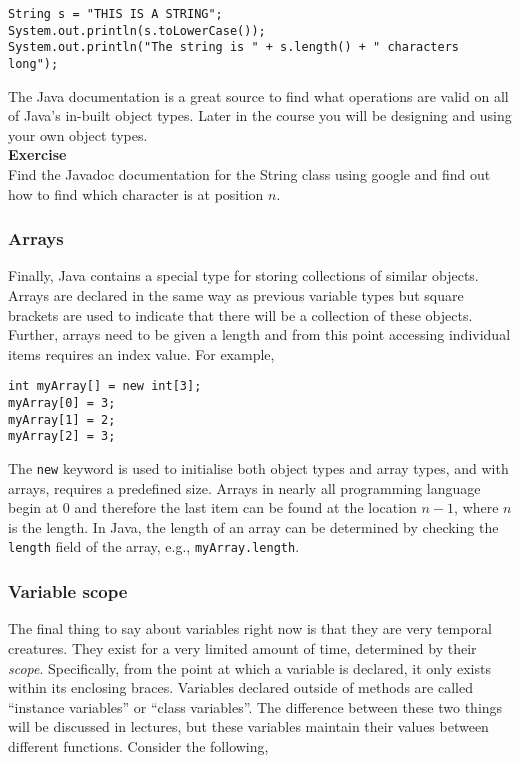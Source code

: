 \begin{verbatim}
String s = "THIS IS A STRING";
System.out.println(s.toLowerCase());
System.out.println("The string is " + s.length() + " characters long");
\end{verbatim}

\noindent
The Java documentation is a great source to find what operations are valid on all of Java's in-built object types. Later in the course you will be designing and using your own object types.\\

\noindent
{\bf Exercise}\\

\noindent
Find the Javadoc documentation for the String class using google and find out how to find which character is at position $n$.

\subsubsection*{Arrays}

Finally, Java contains a special type for storing collections of similar objects. Arrays are declared in the same way as previous variable types but square brackets are used to indicate that there will be a collection of these objects. Further, arrays need to be given a length and from this point accessing individual items requires an index value. For example,

\begin{verbatim}
int myArray[] = new int[3];
myArray[0] = 3;
myArray[1] = 2;
myArray[2] = 3;
\end{verbatim}

\noindent
The {\tt new} keyword is used to initialise both object types and array types, and with arrays, requires a predefined size. Arrays in nearly all programming language begin at 0 and therefore the last item can be found at the location $n-1$, where $n$ is the length. In Java, the length of an array can be determined by checking the {\tt length} field of the array, e.g., {\tt myArray.length}.

\subsubsection*{Variable scope}

The final thing to say about variables right now is that they are very temporal creatures. They exist for a very limited amount of time, determined by their \emph{scope}. Specifically, from the point at which a variable is declared, it only exists within its enclosing braces. Variables declared outside of methods are called ``instance variables'' or ``class variables''. The difference between these two things will be discussed in lectures, but these variables maintain their values between different functions. Consider the following,

